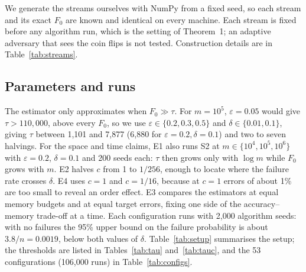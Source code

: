 \documentclass[11pt]{article}
\newcommand{\eps}{\varepsilon}
\begin{document}
We generate the streams ourselves with NumPy from a fixed seed, so each stream
and its exact $F_0$ are known and identical on every machine. Each stream is
fixed before any algorithm run, which is the setting of Theorem~1; an adaptive
adversary that sees the coin flips is not tested. Construction details are in
Table~\ref{tab:streams}.

\subsection{Parameters and runs}\label{sec:parameters}

The estimator only approximates when $F_0 \gg \tau$. For $m = 10^5$,
$\eps = 0.05$ would give $\tau > 110{,}000$, above every $F_0$, so we use
$\eps \in \{0.2, 0.3, 0.5\}$ and $\delta \in \{0.01, 0.1\}$, giving $\tau$
between 1,101 and 7,877 (6,880 for $\eps = 0.2, \delta = 0.1$) and two to
seven halvings. For the space and time claims, E1 also runs S2 at
$m \in \{10^4, 10^5, 10^6\}$ with $\eps = 0.2$, $\delta = 0.1$ and 200 seeds
each: $\tau$ then grows only with $\log m$ while $F_0$ grows with $m$. E2
halves $c$ from 1 to $1/256$, enough to locate where the failure rate crosses
$\delta$. E4 uses $c = 1$ and $c = 1/16$, because at $c = 1$ errors of about
1\% are too small to reveal an order effect. E3 compares the estimators at
equal memory budgets and at equal target errors, fixing one side of the
accuracy--memory trade-off at a time. Each configuration runs with 2,000
algorithm seeds: with no failures the 95\% upper bound on the failure
probability is about $3.8/n = 0.0019$, below both values of $\delta$.
Table~\ref{tab:setup} summarises the setup; the thresholds are listed in
Tables~\ref{tab:tau} and~\ref{tab:tauc}, and the 53 configurations (106,000
runs) in Table~\ref{tab:configs}.
\end{document}
